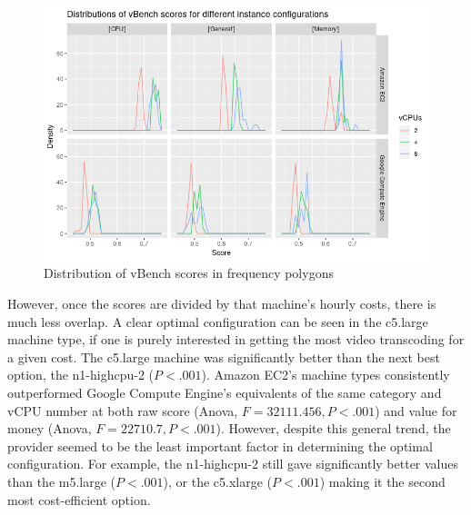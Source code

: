 \documentclass{article}
\begin{document}
\begin{figure}
  \centering
  \includegraphics[scale=0.7]{vbench_dists}
  \caption{Distribution of vBench scores in frequency polygons}
  \label{fig:vBench-dists}
\end{figure}

However, once the scores are divided by that machine's hourly costs, there is much less overlap. A clear optimal configuration can be seen in the c5.large machine type, if one is purely interested in getting the most video transcoding for a given cost. The c5.large machine was significantly better than the next best option, the n1-highcpu-2 ($P < .001$). Amazon EC2's  machine types consistently outperformed Google Compute Engine's equivalents of the same category and vCPU number at both raw score (Anova, $F = 32111.456, P < .001$) and value for money (Anova, $F = 22710.7, P < .001$). However, despite this general trend, the provider seemed to be the least important factor in determining the optimal configuration. For example, the n1-highcpu-2 still gave significantly better values than the m5.large ($P < .001$), or the c5.xlarge ($P < .001$) making it the second most cost-efficient option. 
\end{document}
